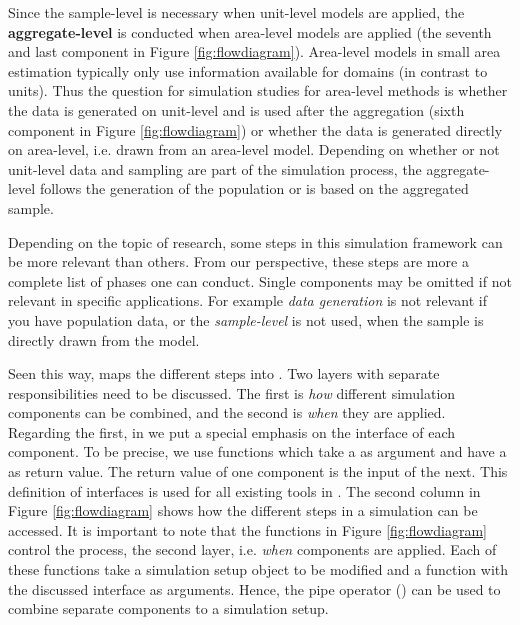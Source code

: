 \documentclass[article]{ajs}
\begin{document}
Since the sample-level is necessary when unit-level models are applied, the \textbf{aggregate-level} is conducted when area-level models are applied (the seventh and last component in Figure \ref{fig:flowdiagram}). Area-level models in small area estimation typically only use information available for domains (in contrast to units). Thus the question for simulation studies for area-level methods is whether the data is generated on unit-level and is used after the aggregation (sixth component in Figure \ref{fig:flowdiagram}) or whether the data is generated directly on area-level, i.e. drawn from an area-level model. Depending on whether or not unit-level data and sampling are part of the simulation process, the aggregate-level follows the generation of the population or is based on the aggregated sample. %

Depending on the topic of research, some steps in this simulation framework can be more relevant than others. From our perspective, these steps are more a complete list of phases one can conduct. Single components may be omitted if not relevant in specific applications. For example \textit{data generation} is not relevant if you have population data, or the \textit{sample-level} is not used, when the sample is directly drawn from the model.

Seen this way,  maps the different steps into . Two layers with separate responsibilities need to be discussed. The first is \textit{how} different simulation components can be combined, and the second is \textit{when} they are applied. Regarding the first, in  we put a special emphasis on the interface of each component. To be precise, we use functions which take a  as argument and have a  as return value. The return value of one component is the input of the next. This definition of interfaces is used for all existing tools in . The second column in Figure \ref{fig:flowdiagram} shows how the different steps in a simulation can be accessed. It is important to note that the functions in Figure \ref{fig:flowdiagram} control the process, the second layer, i.e. \textit{when} components are applied. Each of these functions take a simulation setup object to be modified and a function with the discussed interface as arguments. Hence, the pipe operator (\proglang{\%>\%}) can be used to combine separate components to a simulation setup.
\end{document}
